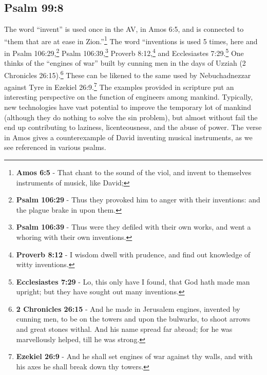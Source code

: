 \subsection{Psalm 99:8}
The word ``invent'' is used once in the AV, in Amos 6:5, and is connected to ``them that are at ease in Zion.''\footnote{\textbf{Amos 6:5} - That chant to the sound of the viol, and invent to themselves instruments of musick, like David;} The word ``inventions is used 5 times, here and in  Psalm 106:29,\footnote{\textbf{Psalm 106:29} - Thus they provoked him to anger with their inventions: and the plague brake in upon them.} Psalm 106:39,\footnote{\textbf{Psalm 106:39} - Thus were they defiled with their own works, and went a whoring with their own inventions.} Proverb 8:12,\footnote{\textbf{Proverb 8:12} - I wisdom dwell with prudence, and find out knowledge of witty inventions. } and Ecclesiastes 7:29.\footnote{\textbf{Ecclesiastes 7:29} - Lo, this only have I found, that God hath made man upright; but they have sought out many inventions.} One thinks of the ``engines of war'' built by cunning men in the days of Uzziah (2 Chronicles 26:15).\footnote{\textbf{2 Chronicles 26:15} - And he made in Jerusalem engines, invented by cunning men, to be on the towers and upon the bulwarks, to shoot arrows and great stones withal. And his name spread far abroad; for he was marvellously helped, till he was strong.} These can be likened to the same used by Nebuchadnezzar against Tyre in Ezekiel 26:9.\footnote{\textbf{Ezekiel 26:9} - And he shall set engines of war against thy walls, and with his axes he shall break down thy towers.} The examples provided in scripture put an interesting perspective on the function of engineers among mankind. Typically, new technologies have vast potential to improve the temporary lot of mankind (although they do nothing to solve the sin problem), but almost without fail the end up contributing to laziness, licenteousness, and the abuse of power. The verse in Amos gives a counterexample of David inventing musical instruments, as we see referenced in various psalms.
